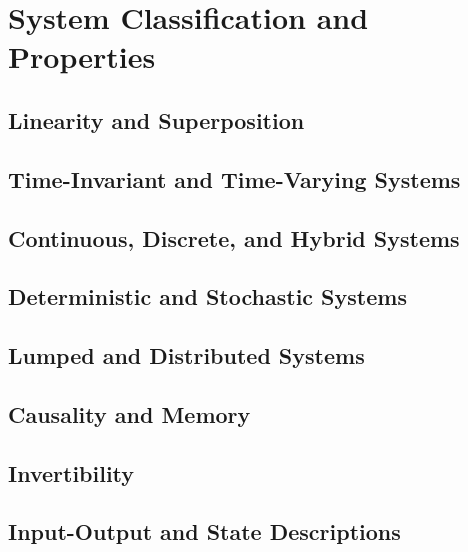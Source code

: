 \chapter{System Classification and Properties} \label{ch:classification}

    \section{Linearity and Superposition}

	\section{Time-Invariant and Time-Varying Systems}

    \section{Continuous, Discrete, and Hybrid Systems}

    \section{Deterministic and Stochastic Systems}

    \section{Lumped and Distributed Systems}

    \section{Causality and Memory}

    \section{Invertibility}

    \section{Input-Output and State Descriptions}